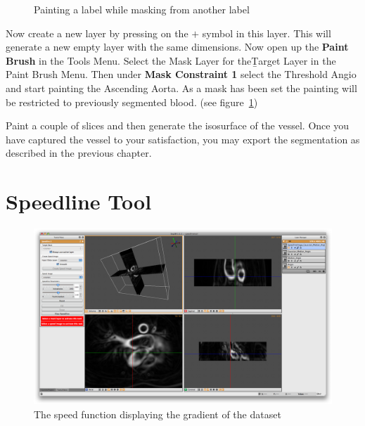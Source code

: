 \documentclass[fleqn,11pt,openany]{book}
\begin{document}
\begin{figure}
\caption{Painting a label while masking from another label}\label{fig:MaskedPainting}
\end{figure}

Now create a new layer by pressing on the $+$ symbol in this layer. This will generate a new empty layer with the same dimensions. Now open up the {\bf Paint Brush} in the Tools Menu. Select the Mask Layer for the{\b Target Layer} in the Paint Brush Menu. Then under {\bf Mask Constraint 1} select the Threshold Angio and start painting the Ascending Aorta. As a mask has been set the painting will be restricted to previously segmented blood. (see figure~\ref{fig:MaskedPainting})

Paint a couple of slices and then generate the isosurface of the vessel. Once you have captured the vessel to your satisfaction, you may export the segmentation as described in the previous chapter.



\chapter{Speedline Tool}

\begin{figure}
\includegraphics[width=\textwidth]{Seg3DTutorial_figures/SpeedlineImage.png}
\caption{The speed function displaying the gradient of the dataset}\label{fig:SpeedImage}
\end{figure}
\end{document}
